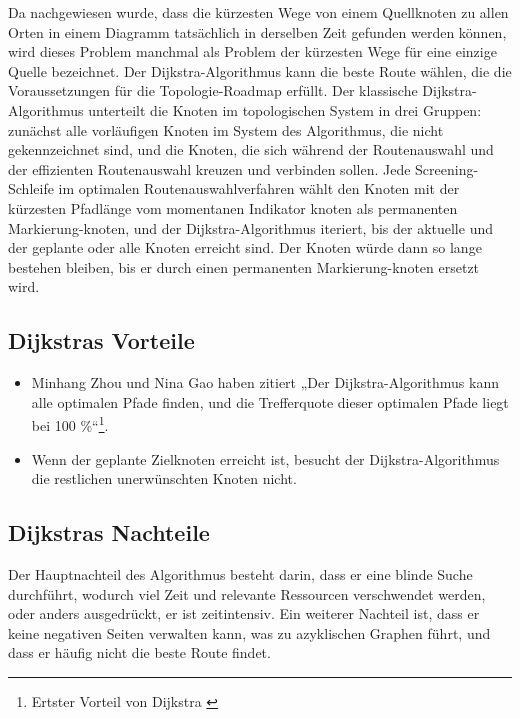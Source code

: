 Da nachgewiesen wurde, dass die kürzesten Wege von einem Quellknoten zu allen Orten in einem Diagramm tatsächlich in derselben Zeit gefunden werden können, wird dieses Problem manchmal als Problem der kürzesten Wege für eine einzige Quelle bezeichnet\cite{Javaid2019}.
\newline
\newline
Der Dijkstra-Algorithmus kann die beste Route wählen, die die Voraussetzungen für die Topologie-Roadmap erfüllt. Der klassische Dijkstra-Algorithmus unterteilt die Knoten im topologischen System in drei Gruppen: zunächst alle vorläufigen Knoten im System des Algorithmus, die nicht gekennzeichnet sind, und die Knoten, die sich während der Routenauswahl und der effizienten Routenauswahl kreuzen und verbinden sollen. Jede Screening-Schleife im optimalen Routenauswahlverfahren wählt den Knoten mit der kürzesten Pfadlänge vom momentanen Indikator knoten als permanenten Markierung-knoten, und der Dijkstra-Algorithmus iteriert, bis der aktuelle und der geplante oder alle Knoten erreicht sind. Der Knoten würde dann so lange bestehen bleiben, bis er durch einen permanenten Markierung-knoten ersetzt wird\cite{Zhou2013}.

\subsection{Dijkstras Vorteile}

\begin{itemize}
	\item Minhang Zhou und Nina Gao haben zitiert „Der Dijkstra-Algorithmus kann alle optimalen Pfade finden, und die Trefferquote dieser optimalen Pfade liegt bei 100 \%“\footnote{Ertster Vorteil von Dijkstra \cite{Zhou2013}}.
	\item Wenn der geplante Zielknoten erreicht ist, besucht der Dijkstra-Algorithmus die restlichen unerwünschten Knoten nicht\cite{Abusalim2020}. 
\end{itemize}


\subsection{Dijkstras Nachteile}

Der Hauptnachteil des Algorithmus besteht darin, dass er eine blinde Suche durchführt, wodurch viel Zeit und relevante Ressourcen verschwendet werden, oder anders ausgedrückt, er ist zeitintensiv. Ein weiterer Nachteil ist, dass er keine negativen Seiten verwalten kann, was zu azyklischen Graphen führt, und dass er häufig nicht die beste Route findet\cite{Mukhlif2020}.

